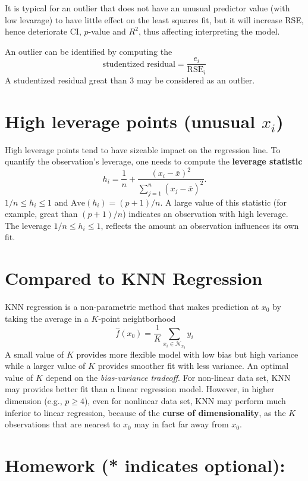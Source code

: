 \documentclass[
  letterpaper,
  DIV=11,
  numbers=noendperiod]{scrreprt}
\begin{document}
It is typical for an outlier that does not have an unusual predictor
value (with low levarage) to have little effect on the least squares
fit, but it will increase RSE, hence deteriorate CI, \(p\)-value and
\(R^2\), thus affecting interpreting the model.

An outlier can be identified by computing the
\[\text{studentized residual}=\frac{e_i}{\text{RSE}_i}\] A studentized
residual great than 3 may be considered as an outlier.

\section{\texorpdfstring{High leverage points (unusual
\(x_i\))}{High leverage points (unusual x\_i)}}\label{high-leverage-points-unusual-x_i}

High leverage points tend to have sizeable impact on the regression
line. To quantify the observation's leverage, one needs to compute the
\textbf{leverage statistic}
\[h_i = \frac{1}{n}+ \frac{(x_i-\bar{x})^2}{\sum_{j=1}^n (x_j-\bar{x})^2}.\]
\(1/n \le h_i\le 1\) and \(\text{Ave}(h_i)=(p+1)/n\). A large value of
this statistic (for example, great than \((p+1)/n\)) indicates an
observation with high leverage. The leverage \(1/n\le h_i\le 1\),
reflects the amount an observation influences its own fit.

\section{Compared to KNN Regression}\label{compared-to-knn-regression}

KNN regression is a non-parametric method that makes prediction at
\(x_0\) by taking the average in a \(K\)-point neightborhood \[
\hat{f}(x_0) = \frac{1}{K}\sum_{x_i \in \mathcal{N}_{x_0}}{y_i}
\] A small value of \(K\) provides more flexible model with low bias but
high variance while a larger value of \(K\) provides smoother fit with
less variance. An optimal value of \(K\) depend on the
\emph{bias-variance tradeoff}. For non-linear data set, KNN may provides
better fit than a linear regression model. However, in higher dimension
(e.g., \(p\ge 4\)), even for nonlinear data set, KNN may perform much
inferior to linear regression, because of the \textbf{curse of
dimensionality}, as the \(K\) observations that are nearest to \(x_0\)
may in fact far away from \(x_0\).

\section{Homework (* indicates
optional):}\label{homework-indicates-optional-1}
\end{document}
